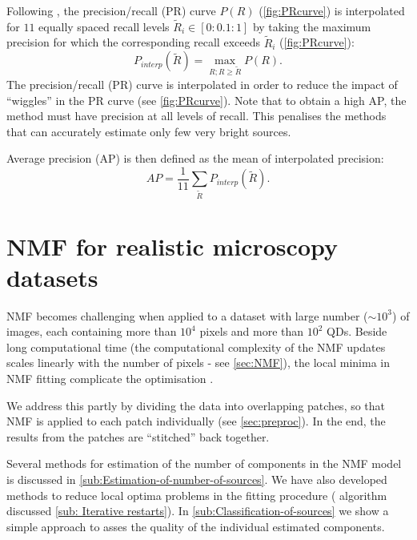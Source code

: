 Following \cite{Everingham2009}, the precision/recall (PR) curve $P(R)$ (\autoref{fig:PRcurve}\aaa) is interpolated for $11$ equally spaced recall levels $\tilde{R}_i\in[0:0.1:1]$ by taking the maximum precision for which the corresponding recall exceeds $\tilde{R}_i$ (\autoref{fig:PRcurve}\bbb):
%
\begin{equation}
	P_{interp}(\tilde{R})=\max_{R;R\geq \tilde{R}}P(R).
\end{equation}
%
The precision/recall (PR) curve is interpolated in order to reduce the impact of ``wiggles'' in the PR curve (see \autoref{fig:PRcurve}\bbb). Note that to obtain a high AP, the method must have precision at all levels of recall. This penalises the methods that can accurately estimate only few very bright sources. 

Average precision (AP) is then defined as the mean of interpolated precision:
%
\begin{equation}
	AP=\frac{1}{11}\sum_{\tilde{R}}{P_{interp}(\tilde{R})}.
	\label{eq:AP}
\end{equation}
\afterpage{\clearpage}

\section{NMF for realistic microscopy datasets \label{sec:NMF-for-real}}

NMF becomes challenging when applied to a dataset with large number ($\sim 10^3$) of images, each containing more than $10^4$ pixels and more than $10^2$ QDs. Beside long computational time (the computational complexity of the NMF updates scales linearly with the number of pixels - see \autoref{sec:NMF}), the local minima in NMF fitting complicate the optimisation \cite{Kim2008}. 

We address this partly by dividing the data into overlapping patches, so that NMF is applied to each patch individually (see \autoref{sec:preproc}).  In the end, the results from the patches are ``stitched'' back together. 

Several methods for estimation of the number of components in the NMF model is discussed in \autoref{sub:Estimation-of-number-of-sources}. We have also developed methods to reduce local optima problems in the fitting procedure (\inmf{} algorithm discussed \autoref{sub: Iterative restarts}). In \autoref{sub:Classification-of-sources} we show a simple approach to asses the quality of the individual estimated components. 

